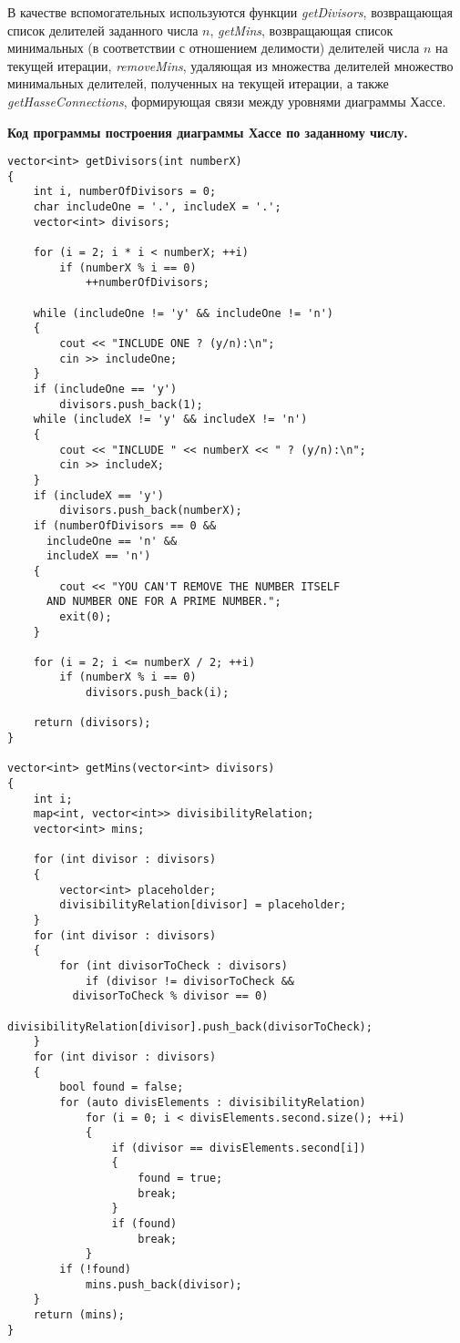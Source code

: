 \documentclass[spec, och, otchet, hidelinks]{SCWorks}
\begin{document}
\par В качестве вспомогательных используются функции \textit{getDivisors},
возвращающая список делителей заданного числа $n$, \textit{getMins},
возвращающая список минимальных (в соответствии с отношением делимости)
делителей числа $n$ на текущей итерации, \textit{removeMins}, удаляющая из
множества делителей множество минимальных делителей, полученных на текущей
итерации, а также \textit{getHasseConnections}, формирующая связи между
уровнями диаграммы Хассе. \\

\par \textbf{Код программы построения диаграммы Хассе по заданному числу.}

\begin{lstlisting}[caption=Код программы., mathescape]
vector<int> getDivisors(int numberX)
{
	int i, numberOfDivisors = 0;
	char includeOne = '.', includeX = '.';
	vector<int> divisors;

	for (i = 2; i * i < numberX; ++i)
		if (numberX % i == 0)
			++numberOfDivisors;

	while (includeOne != 'y' && includeOne != 'n')
	{
		cout << "INCLUDE ONE ? (y/n):\n";
		cin >> includeOne;
	}
	if (includeOne == 'y')
		divisors.push_back(1);
	while (includeX != 'y' && includeX != 'n')
	{
		cout << "INCLUDE " << numberX << " ? (y/n):\n";
		cin >> includeX;
	}
	if (includeX == 'y')
		divisors.push_back(numberX);
	if (numberOfDivisors == 0 && 
      includeOne == 'n' && 
      includeX == 'n')
	{
		cout << "YOU CAN'T REMOVE THE NUMBER ITSELF 
      AND NUMBER ONE FOR A PRIME NUMBER.";
		exit(0);
	}

	for (i = 2; i <= numberX / 2; ++i)
		if (numberX % i == 0)
			divisors.push_back(i);

	return (divisors);
}

vector<int> getMins(vector<int> divisors)
{
	int i;
	map<int, vector<int>> divisibilityRelation;
	vector<int> mins;

	for (int divisor : divisors)
	{
		vector<int> placeholder;
		divisibilityRelation[divisor] = placeholder;
	}
	for (int divisor : divisors)
	{
		for (int divisorToCheck : divisors)
			if (divisor != divisorToCheck && 
          divisorToCheck % divisor == 0)
				divisibilityRelation[divisor].push_back(divisorToCheck);
	}
	for (int divisor : divisors)
	{
		bool found = false;
		for (auto divisElements : divisibilityRelation)
			for (i = 0; i < divisElements.second.size(); ++i)
			{
				if (divisor == divisElements.second[i])
				{
					found = true;
					break;
				}
				if (found)
					break;
			}
		if (!found)
			mins.push_back(divisor);
	}
	return (mins);
}


\end{lstlisting}
\end{document}
